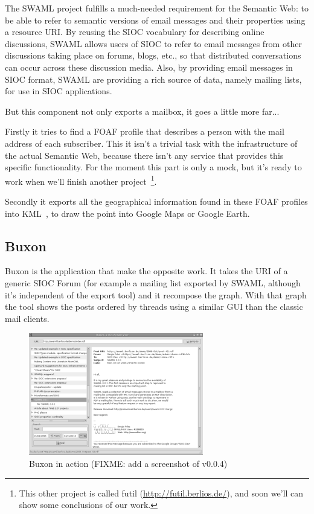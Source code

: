 \documentclass{llncs}
\begin{document}
The SWAML project fulfills a much-needed requirement for the Semantic Web: to be able 
to refer to semantic versions of email messages and their properties using a resource 
URI. By reusing the SIOC vocabulary for describing online discussions, SWAML allows 
users of SIOC to refer to email messages from other discussions taking place on forums, 
blogs, etc., so that distributed conversations can occur across these discussion media. 
Also, by providing email messages in SIOC format, SWAML are providing a rich source of 
data, namely mailing lists, for use in SIOC applications.

But this component not only exports a mailbox, it goes a little more far...

Firstly it tries to find a FOAF profile that describes a person with the mail address 
of each subscriber. This it isn't a trivial task with the infrastructure of the actual 
Semantic Web, because there isn't any service that provides this specific functionality.
For the moment this part is only a mock, but it's ready to work when we'll finish another 
project~\footnote{This other project is called futil (\url{http://futil.berlios.de/}),
and soon we'll can show some conclusions of our work.}.

Secondly it exports all the geographical information found in these FOAF profiles into 
KML~\cite{KML}, to draw the point into Google Maps or Google Earth.

\subsection{Buxon}

Buxon is the application that make the opposite work. It takes the URI of a generic SIOC 
Forum (for example a mailing list exported by SWAML, although it's independent of the 
export tool) and it recompose the graph. With that graph the tool shows the posts ordered 
by threads using a similar GUI than the classic mail clients.

\begin{figure}[ht]
 \centering
 \includegraphics[bb=0 0 288 202]{images/buxon.png}
 \caption{Buxon in action (FIXME: add a screenshot of v0.0.4)}
\end{figure}
\end{document}
